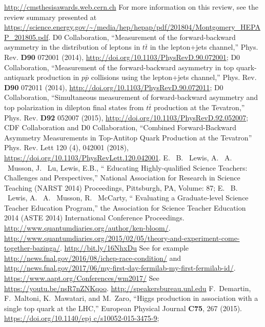\begin{thebibliography}{99}
%
 \url{http://cmsthesisawards.web.cern.ch}
%
 For more information on this review, see the review summary presented at \url{https://science.energy.gov/~/media/hep/hepap/pdf/201804/Montgomery_HEPAP_201805.pdf}.
%
D0 Collaboration, ``Measurement of the forward-backward asymmetry in the distribution of leptons in $t\bar{t}$ in the lepton+jets channel,'' Phys. Rev. {\bf D90} 072001 (2014), \url{http://doi.org/10.1103/PhysRevD.90.072001};
D0 Collaboration, ``Measurement of the forward-backward asymmetry in top quark-antiquark production in $p\bar{p}$ collisions using the lepton+jets channel,'' Phys. Rev. {\bf D90} 072011 (2014), \url{http://doi.org/10.1103/PhysRevD.90.072011};
D0 Collaboration, ``Simultaneous measurement of forward-backward asymmetry and top polarization in dilepton final states from $t\bar{t}$ production at the Tevatron,'' Phys. Rev. {\bf D92} 052007 (2015), \url{http://doi.org/10.1103/PhysRevD.92.052007};
CDF Collaboration and D0 Collaboration, ``Combined Forward-Backward Asymmetry Measurements in Top-Antitop Quark Production at the Tevatron'' Phys. Rev. Lett 120 (4), 042001 (2018), \url{https://doi.org/10.1103/PhysRevLett.120.042001}.
%
%
E. ~B. ~Lewis, A. ~A. ~Musson, J. ~Lu, Lewis, E.B., `` Educating Highly-qualified Science Teachers: Challenges and Perspectives,” National Association for Research in Science Teaching (NARST 2014) Proceedings, Pittsburgh, PA, Volume: 87; 
E. ~B. ~Lewis, A. ~A. ~Musson, R. ~McCarty, `` Evaluating a Graduate-level Science Teacher Education Program,” the Association for Science Teacher Education 2014 (ASTE 2014) International Conference Proceedings.
%
 \url{http://www.quantumdiaries.org/author/ken-bloom/}.
%
 \url{http://www.quantumdiaries.org/2015/02/05/theory-and-experiment-come-together-bazinga/}.
%
 \url{http://bit.ly/16NhxDu}
%
 See for example \url{http://news.fnal.gov/2016/08/ichep-race-condition/} and \url{http://news.fnal.gov/2017/06/my-first-day-fermilab-my-first-fermilab-id/}.
%
 \url{https://www.aapt.org/Conferences/wm2017/}
%
 See \url{https://youtu.be/nsR7nZNKqoo}.
%
 \url{http://speakersbureau.unl.edu}
%
 F.~Demartin, F.~Maltoni, K.~Mawatari, and M.~Zaro,
  ``Higgs production in association with a single top quark at the LHC,''
  European Physical Journal {\bf C75}, 267
  (2015). \url{https://doi.org/10.1140/epj c/s10052-015-3475-9};

\end{thebibliography}
